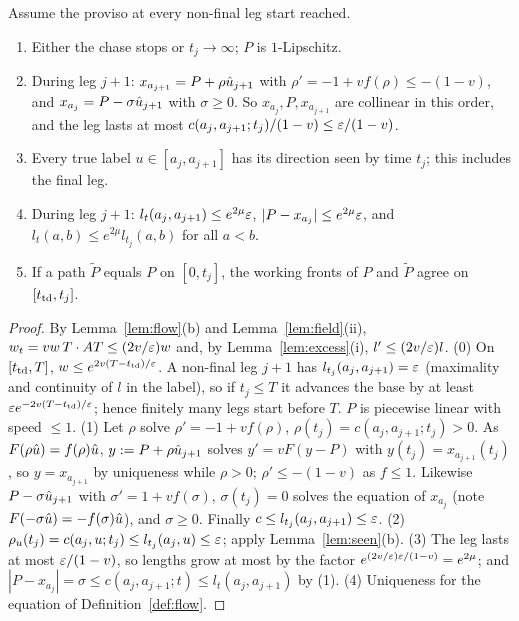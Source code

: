 \begin{lemma}\label{lem:chase}
Assume the proviso at every non-final leg start reached.
\begin{enumerate}
\item[(0)] Either the chase stops or $t_j\to\infty$; $P$ is $1$-Lipschitz.
\item[(1)] During leg $j+1$: $x_{a_{j+1}}=P+\rho\hat u_{j+1}$ with $\rho'=-1+vf(\rho)\le-(1-v)$, and $x_{a_j}=P-\sigma\hat u_{j+1}$ with
$\sigma\ge0$. So $x_{a_j},P,x_{a_{j+1}}$ are collinear in this order, and the leg lasts at most
$c(a_j,a_{j+1};t_j)/(1-v)\le\varepsilon/(1-v)$.
\item[(2)] Every true label $u\in[a_j,a_{j+1}]$ has its direction seen by time $t_j$; this includes the final leg.
\item[(3)] During leg $j+1$: $l_t(a_j,a_{j+1})\le e^{2\mu}\varepsilon$, $|P-x_{a_j}|\le e^{2\mu}\varepsilon$, and $l_t(a,b)\le e^{2\mu}l_{t_j}(a,b)$
for all $a<b$.
\item[(4)] If a path $\tilde P$ equals $P$ on $[0,t_j]$, the working fronts of $P$ and $\tilde P$ agree on $[t_{\mathrm{td}},t_j]$.
\end{enumerate}
\end{lemma}

\begin{proof}
By Lemma~\ref{lem:flow}(b) and Lemma~\ref{lem:field}(ii), $w_t=vw\,T\cdot AT\le(2v/\varepsilon)w$ and, by Lemma~\ref{lem:excess}(i),
$l'\le(2v/\varepsilon)l$.
(0) On $[t_{\mathrm{td}},T]$, $w\le e^{2v(T-t_{\mathrm{td}})/\varepsilon}$. A non-final leg $j+1$ has $l_{t_j}(a_j,a_{j+1})=\varepsilon$ (maximality and continuity of $l$
in the label), so if $t_j\le T$ it advances the base by at least $\varepsilon e^{-2v(T-t_{\mathrm{td}})/\varepsilon}$; hence finitely many legs start
before $T$. $P$ is piecewise linear with speed $\le1$.
(1) Let $\rho$ solve $\rho'=-1+vf(\rho)$, $\rho(t_j)=c(a_j,a_{j+1};t_j)>0$. As $F(\rho\hat u)=f(\rho)\hat u$, $y:=P+\rho\hat u_{j+1}$ solves
$y'=vF(y-P)$ with $y(t_j)=x_{a_{j+1}}(t_j)$, so $y=x_{a_{j+1}}$ by uniqueness while $\rho>0$; $\rho'\le-(1-v)$ as $f\le1$. Likewise
$P-\sigma\hat u_{j+1}$ with $\sigma'=1+vf(\sigma)$, $\sigma(t_j)=0$ solves the equation of $x_{a_j}$ (note $F(-\sigma\hat u)=-f(\sigma)\hat u$),
and $\sigma\ge0$. Finally $c\le l_{t_j}(a_j,a_{j+1})\le\varepsilon$.
(2) $\rho_u(t_j)=c(a_j,u;t_j)\le l_{t_j}(a_j,u)\le\varepsilon$; apply Lemma~\ref{lem:seen}(b).
(3) The leg lasts at most $\varepsilon/(1-v)$, so lengths grow at most by the factor $e^{(2v/\varepsilon)\varepsilon/(1-v)}=e^{2\mu}$; and
$|P-x_{a_j}|=\sigma\le c(a_j,a_{j+1};t)\le l_t(a_j,a_{j+1})$ by (1).
(4) Uniqueness for the equation of Definition~\ref{def:flow}.
\end{proof}

